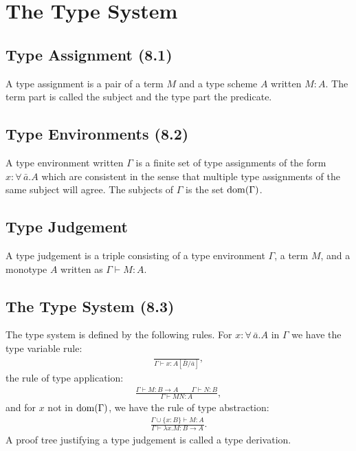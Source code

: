 \section{The Type System}

\subsection{Type Assignment (8.1)}

A type assignment is a pair of a term $M$ and a type scheme $A$
written $M:A$. The term part is called the subject and the type
part the predicate.

\subsection{Type Environments (8.2)}

A type environment written $\Gamma$ is a finite set of
type assignments of the form $x : \forall \, \bar{a}.A$
which are consistent in the sense that multiple 
type assignments of the same subject will agree.
The subjects of $\Gamma$ is the set $\operatorname{dom}(\Gamma)$.

\subsection{Type Judgement}

A type judgement is a triple consisting of a type environment $\Gamma$,
a term $M$, and a monotype $A$ written as $\Gamma \vdash M : A$.

\subsection{The Type System (8.3)}

The type system is defined by the following rules.
For $x : \forall \, \bar{a}.A$ in $\Gamma$ we have the type variable
rule: \begin{align*}
    \frac{}{\Gamma \vdash x : A[\bar{B}/\bar{a}]},
\end{align*} the rule of type application: \begin{align*}
    \frac{
        \Gamma \vdash M : B \to A \qquad \Gamma \vdash N : B
    }{
        \Gamma \vdash MN : A
    },
\end{align*} and for $x$ not in $\operatorname{dom}(\Gamma)$, we have the rule
of type abstraction: \begin{align*}
    \frac{
        \Gamma \cup \{x : B\} \vdash M : A
    }{
        \Gamma \vdash \lambda x.M : B \to A
    }.
\end{align*} A proof tree justifying a type judgement is called a type
derivation.

